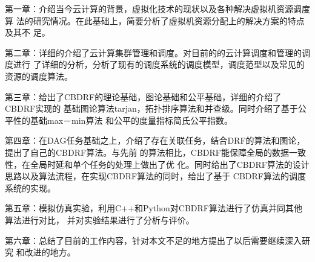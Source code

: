 第一章：介绍当今云计算的背景，虚拟化技术的现状以及各种解决虚拟机资源调度算
法的研究情况。在此基础上，简要分析了虚拟机资源分配上的解决方案的特点及其不
足。

第二章：详细的介绍了云计算集群管理和调度。对目前的的云计算调度和管理的调度进行
了详细的分析，分析了现有的调度系统的调度模型，调度范型以及常见的资源的调度算法。

第三章：给出了CBDRF的理论基础，图论基础和公平基础，详细的介绍了CBDRF实现的
基础图论算法tarjan，拓扑排序算法和并查级。同时介绍了基于公平性的基础max－min算法
和公平的度量指标简氏公平指数。

第四章：在DAG任务基础之上，介绍了存在关联任务，结合DRF的算法和图论，提出了自己的CBDRF算法。与先前
的算法相比，CBDRF能保障全局的数据一致性，在全局时延和单个任务的处理上做出了优
化。同时给出了CBDRF算法的设计思路以及算法流程，在实现CBDRF算法的同时，给出了基于
CBDRF算法的调度系统的实现。

第五章：模拟仿真实验，利用C++和Python对CBDRF算法进行了仿真并同其他算法进行对比，
并对实验结果进行了分析与评价。

第六章：总结了目前的工作内容，针对本文不足的地方提出了以后需要继续深入研究
和改进的地方。
